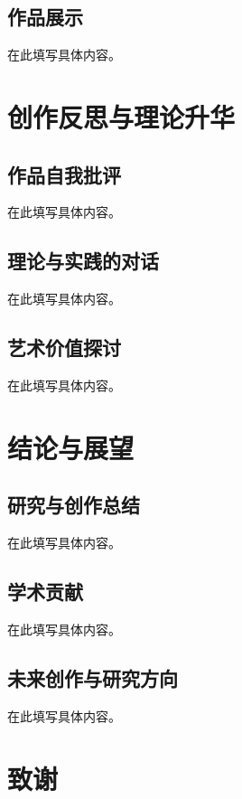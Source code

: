 \documentclass[a4paper,12pt,openright]{ctexrep}
\begin{document}
\section{作品展示}
在此填写具体内容。


\chapter{创作反思与理论升华}
\section{作品自我批评}
在此填写具体内容。

\section{理论与实践的对话}
在此填写具体内容。

\section{艺术价值探讨}
在此填写具体内容。


\chapter{结论与展望}
\section{研究与创作总结}
在此填写具体内容。

\section{学术贡献}
在此填写具体内容。

\section{未来创作与研究方向}
在此填写具体内容。






\chapter*{致\quad 谢}
\end{document}
